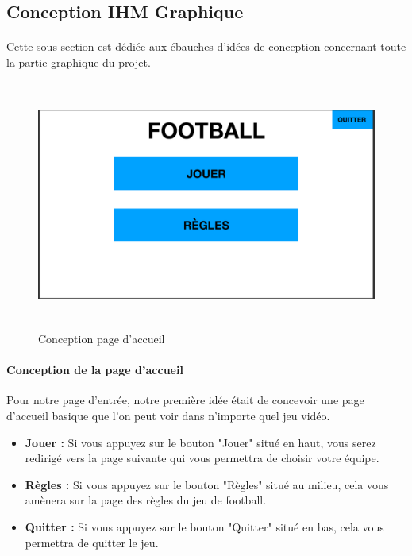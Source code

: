 \subsection{Conception IHM Graphique}
\label{sec:conceptGraph}

\paragraph{}
    Cette sous-section est dédiée aux ébauches d'idées de conception concernant toute la partie graphique du projet.
    
\begin{figure}[h]
\centering
\includegraphics[width=12.82cm, height=8.2cm]{images/ConceptIHM1.png}
\caption{Conception page d'accueil}
\label{fig:accueil}
\end{figure}

\paragraph{Conception de la page d'accueil}
    Pour notre page d'entrée, notre première idée était de concevoir une page d'accueil basique que l'on peut voir dans n'importe quel jeu vidéo. 
    
    \vspace{15pt}

\begin{itemize}
    \item \textbf{Jouer :} 
        Si vous appuyez sur le bouton "Jouer" situé en haut, vous serez redirigé vers la page suivante qui vous permettra de choisir votre équipe.

    \vspace{15pt}

    \item \textbf{Règles :} 
        Si vous appuyez sur le bouton "Règles" situé au milieu, cela vous amènera sur la page des règles du jeu de football.

    \vspace{15pt}

    \item \textbf{Quitter :} 
        Si vous appuyez sur le bouton "Quitter" situé en bas, cela vous permettra de quitter le jeu.
        
    \vspace{15pt}
\end{itemize}

